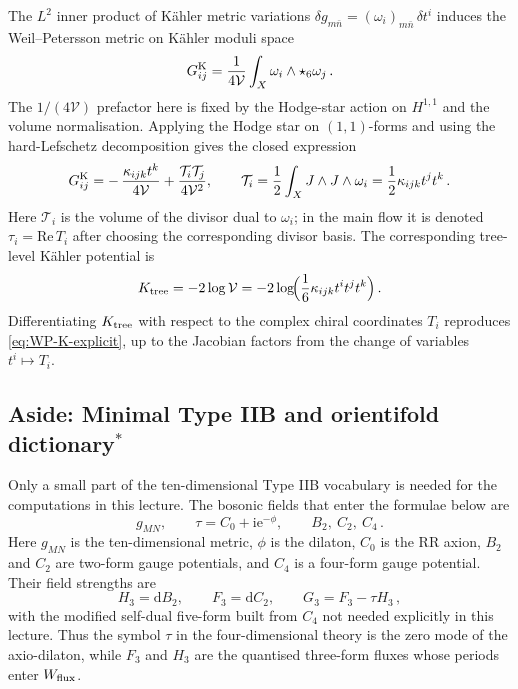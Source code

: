The $L^2$ inner product of K\"ahler metric variations
$\delta g_{m\bar n}=(\omega_i)_{m\bar n}\,\delta t^i$ induces the
Weil--Petersson metric on K\"ahler moduli space
\cite{Strominger:1990pd,Candelas:1990pi}
\begin{equation}\label{eq:WP-K-L2}
    G^{\rm K}_{ij}
    =
    \frac{1}{4\mathcal{V}}
    \int_X\omega_i\wedge\star_6\omega_j\, .
\end{equation}
The $1/(4\mathcal{V})$ prefactor here is fixed by the
Hodge-star action on $H^{1,1}$ and the volume normalisation.
Applying the Hodge star on $(1,1)$-forms and using the hard-Lefschetz
decomposition gives the closed expression
\begin{equation}\label{eq:WP-K-explicit}
    G^{\rm K}_{ij}
    =
    -\,\frac{\kappa_{ijk}t^k}{4\mathcal{V}}
    +
    \frac{\mathcal{T}_i\mathcal{T}_j}{4\mathcal{V}^2},
    \qquad
    \mathcal{T}_i
    =
    \frac12\int_XJ\wedge J\wedge\omega_i
    =
    \frac12\kappa_{ijk}t^jt^k\, .
\end{equation}
Here $\mathcal{T}_i$ is the volume of the divisor dual to
$\omega_i$; in the main flow it is denoted
$\tau_i=\mathrm{Re}\,T_i$ after choosing the corresponding divisor
basis.  The corresponding tree-level K\"ahler potential is
\begin{equation}\label{eq:K-tree-WP}
    K_{\rm tree}
    =
    -2\log\mathcal{V}
    =
    -2\log\!\Bigl(
        \frac{1}{6}\kappa_{ijk}t^it^jt^k
    \Bigr)\, .
\end{equation}
Differentiating $K_{\rm tree}$ with respect to the complex chiral
coordinates $T_i$ reproduces \eqref{eq:WP-K-explicit}, up to the
Jacobian factors from the change of variables $t^i\mapsto T_i$.


\subsection{Aside: Minimal Type IIB and orientifold dictionary\texorpdfstring{$^{\ast}$}{*}}\label{ssec:L2-IIB}\label{ssec:L2-orientifold}

Only a small part of the ten-dimensional Type IIB
vocabulary is needed for the computations in this lecture.  The
bosonic fields that enter the formulae below are
\begin{equation}\label{eq:axio-dilaton}
    g_{MN},\qquad
    \tau=C_0+\mathrm{i} \mathrm{e}^{-\phi},\qquad
    B_2,\ C_2,\ C_4\, .
\end{equation}
Here $g_{MN}$ is the ten-dimensional metric, $\phi$ is the dilaton,
$C_0$ is the RR axion, $B_2$ and $C_2$ are two-form gauge
potentials, and $C_4$ is a four-form gauge potential.  Their
field strengths are
\begin{equation}
    H_3=\mathrm{d}B_2,\qquad
    F_3=\mathrm{d}C_2,\qquad
    G_3=F_3-\tau H_3\, ,
\end{equation}
with the modified self-dual five-form built from $C_4$ not needed
explicitly in this lecture.  Thus the symbol $\tau$ in the
four-dimensional theory is the zero mode of the axio-dilaton, while
$F_3$ and $H_3$ are the quantised three-form fluxes whose periods
enter $W_{\rm flux}$.

